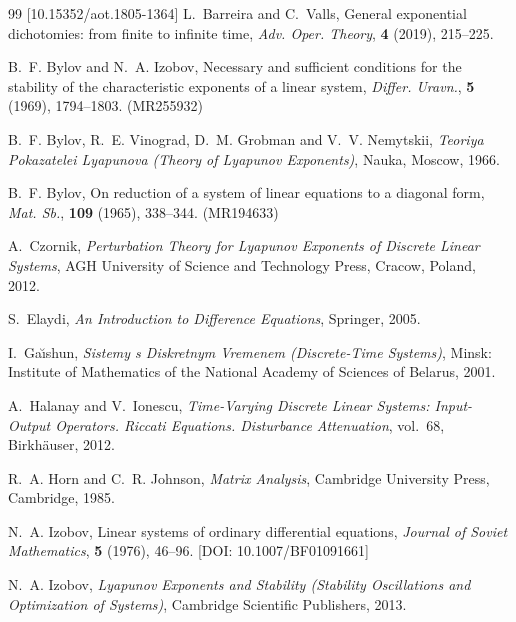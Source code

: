 \documentclass[11pt]{article}
\begin{document}
\begin{thebibliography}{99}
 [10.15352/aot.1805-1364]
\newblock L.~Barreira and C.~Valls,
\newblock General exponential dichotomies: from finite to infinite time,
\newblock \emph{Adv. Oper. Theory}, \textbf{4} (2019), 215--225.
\fi


\newblock B.~F. Bylov and N.~A. Izobov,
\newblock Necessary and sufficient conditions for the stability of the
  characteristic exponents of a linear system,
\newblock \emph{Differ. Uravn.}, \textbf{5} (1969), 1794--1803. (MR255932)

\newblock B.~F. Bylov, R.~E. Vinograd, D.~M. Grobman and V.~V. Nemytskii,
\newblock \emph{Teoriya Pokazatelei {Lyapunova} ({Theory} of {Lyapunov}
  Exponents)},
\newblock Nauka, Moscow, 1966.

\newblock B.~F. Bylov,
\newblock On reduction of a system of linear equations to a diagonal form,
\newblock \emph{Mat. Sb.}, \textbf{109} (1965), 338--344. (MR194633)


\newblock A.~Czornik,
\newblock \emph{Perturbation Theory for Lyapunov Exponents of Discrete Linear
  Systems},
\newblock AGH University of Science and Technology Press, Cracow, Poland, 2012.

\newblock S.~Elaydi,
\newblock \emph{An Introduction to Difference Equations},
\newblock Springer, 2005.

\newblock I.~Ga\u{\i}shun,
\newblock \emph{Sistemy s Diskretnym Vremenem (Discrete-Time Systems)},
\newblock Minsk: Institute of Mathematics of the National Academy of Sciences
  of Belarus, 2001.

\newblock A.~Halanay and V.~Ionescu,
\newblock \emph{Time-Varying Discrete Linear Systems: Input-Output Operators.
  Riccati Equations. Disturbance Attenuation}, vol.~68,
\newblock Birkh{\"a}user, 2012.


\newblock R.~A. Horn and C.~R. Johnson,
\newblock \emph{Matrix Analysis},
\newblock Cambridge University Press, Cambridge, 1985.

\newblock N.~A. Izobov,
\newblock Linear systems of ordinary differential equations,
\newblock \emph{Journal of Soviet Mathematics}, \textbf{5} (1976), 46--96. [DOI: 10.1007/BF01091661]

\newblock N.~A. Izobov,
\newblock \emph{Lyapunov Exponents and Stability (Stability Oscillations and
  Optimization of Systems)},
\newblock Cambridge Scientific Publishers, 2013.


\end{thebibliography}
\end{document}
